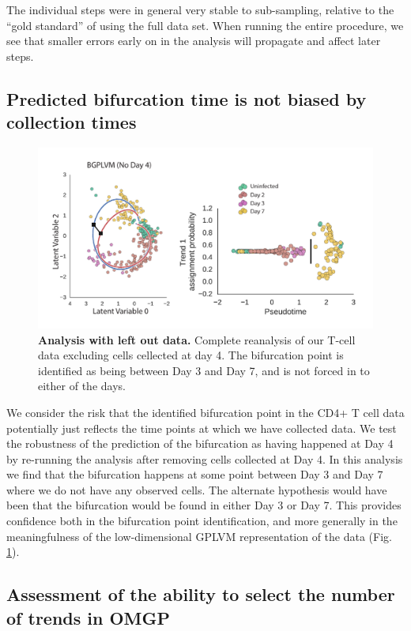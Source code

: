 The individual steps were in general very stable to sub-sampling, relative to the ``gold standard'' of using the full data set. When running the entire procedure, we see that smaller errors early on in the analysis will propagate and affect later steps.

\subsection{Predicted bifurcation time is not biased by collection times}

\begin{figure}
    \centering
    \includegraphics[width=\textwidth]{"fig-no-day4"}
    \caption[Analysis with left out data]{\textbf{Analysis with left out data.} Complete reanalysis of our T-cell data excluding cells cellected at day 4. The bifurcation point is identified as being between Day 3 and Day 7, and is not forced in to either of the days.}
    \label{fig:no-day4}
\end{figure}

We consider the risk that the identified bifurcation point in the CD4+ T cell data potentially just reflects the time points at which we have collected data. We test the robustness of the prediction of the bifurcation as having happened at Day 4 by re-running the analysis after removing cells collected at Day 4. In this analysis we find that the bifurcation happens at some point between Day 3 and Day 7 where we do not have any observed cells. The alternate hypothesis would have been that the bifurcation would be found in either Day 3 or Day 7. This provides confidence both in the bifurcation point identification, and more generally in the meaningfulness of the low-dimensional GPLVM representation of the data (Fig. \ref{fig:no-day4}).

\subsection{Assessment of the ability to select the number of trends in OMGP}


